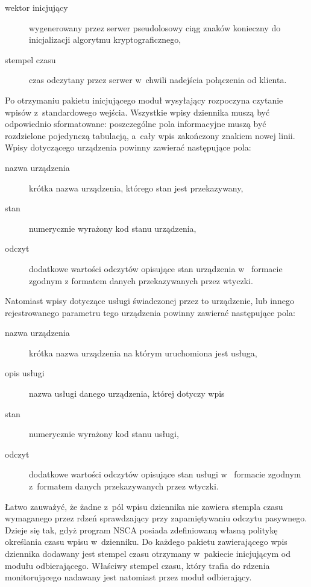 \begin{description}
\item[wektor inicjujący] wygenerowany przez serwer pseudolosowy ciąg
  znaków konieczny do inicjalizacji algorytmu kryptograficznego,
\item[stempel czasu] czas odczytany przez serwer w~chwili nadejścia
  połączenia od klienta.
\end{description} 

Po otrzymaniu pakietu inicjującego moduł wysyłający rozpoczyna
czytanie wpisów z~standardowego wejścia. Wszystkie wpisy dziennika
muszą być odpowiednio sformatowane: poszczególne pola informacyjne
muszą być rozdzielone pojedynczą tabulacją, a~cały wpis zakończony
znakiem nowej linii. Wpisy dotyczącego urządzenia powinny zawierać
następujące pola:

\begin{description}
\item[nazwa urządzenia] krótka nazwa urządzenia, którego stan jest
  przekazywany,
\item[stan] numerycznie wyrażony kod stanu urządzenia,
\item[odczyt] dodatkowe wartości odczytów opisujące stan urządzenia w~
  formacie zgodnym z formatem danych przekazywanych przez wtyczki.
\end{description}

Natomiast wpisy dotyczące usługi świadczonej przez to urządzenie, lub
innego rejestrowanego parametru tego urządzenia powinny zawierać
następujące pola:

\begin{description}
\item[nazwa urządzenia] krótka nazwa urządzenia na którym uruchomiona
  jest usługa,
\item[opis usługi] nazwa usługi danego urządzenia, której dotyczy wpis
\item[stan] numerycznie wyrażony kod stanu usługi,
\item[odczyt] dodatkowe wartości odczytów opisujące stan usługi w~
  formacie zgodnym z~formatem danych przekazywanych przez wtyczki.
\end{description}

Łatwo zauważyć, że żadne z~pól wpisu dziennika nie zawiera stempla
czasu wymaganego przez rdzeń sprawdzający przy zapamiętywaniu odczytu
pasywnego. Dzieje się tak, gdyż program NSCA posiada zdefiniowaną
własną politykę określania czasu wpisu w~dzienniku. Do każdego pakietu
zawierającego wpis dziennika dodawany jest stempel czasu otrzymany
w~pakiecie inicjującym od modułu odbierającego. Właściwy stempel
czasu, który trafia do rdzenia monitorującego nadawany jest natomiast
przez moduł odbierający.

